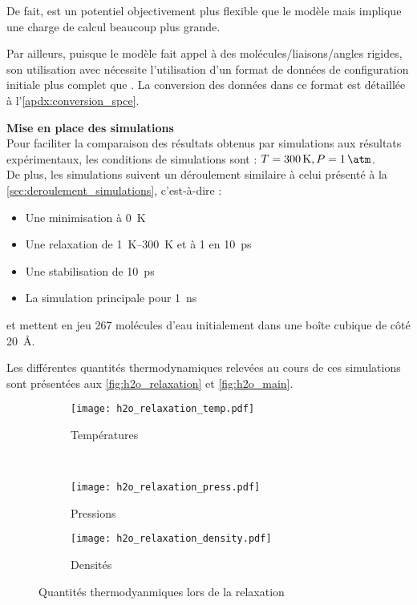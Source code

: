 De fait, \reaxff{} est un potentiel objectivement plus flexible que le modèle \spce{} mais implique une charge de calcul beaucoup plus grande.

Par ailleurs, puisque le modèle \spce{} fait appel à des molécules/liaisons/angles rigides, son utilisation avec \lammps{} nécessite l'utilisation d'un format de données de configuration initiale plus complet que \reaxff{}. La conversion des données dans ce format est détaillée à l'\autoref{apdx:conversion_spce}.

\textbf{Mise en place des simulations}\\
Pour faciliter la comparaison des résultats obtenus par simulations aux résultats expérimentaux, les conditions de simulations sont : $T = \qty{300}{\kelvin}, P = \qty{1}{\atm}$.\\
De plus, les simulations suivent un déroulement similaire à celui présenté à la \autoref{sec:deroulement_simulations}, c'est-à-dire :
\begin{itemize}
    \item Une minimisation à \qty{0}{\kelvin}
    \item Une relaxation de \qtyrange{1}{300}{\kelvin} et à \qty{1}{\atm} en \qty{10}{\pico \second}
    \item Une stabilisation de \qty{10}{\pico \second}
    \item La simulation principale pour \qty{1}{\nano \second}
\end{itemize}
et mettent en jeu \num{267} molécules d'eau initialement dans une boîte cubique de côté \qty{20}{\angstrom}.

Les différentes quantités thermodynamiques relevées au cours de ces simulations sont présentées aux \autoref{fig:h2o_relaxation} et \ref{fig:h2o_main}.

\begin{figure}[h!]
    \centering
    \begin{subfigure}{.49\textwidth}
        \texttt{[image: h2o\_relaxation\_temp.pdf]}
        \caption{Températures}
    \end{subfigure}%
    ~
    \begin{subfigure}{.49\textwidth}
        \texttt{[image: h2o\_relaxation\_press.pdf]}
        \caption{Pressions}
    \end{subfigure}
    \begin{subfigure}{.49\textwidth}
        \texttt{[image: h2o\_relaxation\_density.pdf]}
        \caption{Densités}
    \end{subfigure}
    \caption{Quantités thermodyanmiques lors de la relaxation}
    \label{fig:h2o_relaxation}
\end{figure}


